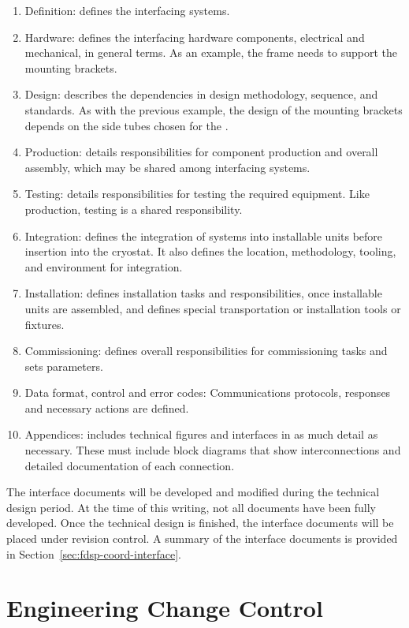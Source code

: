 \begin{enumerate}
 \item Definition: defines the interfacing systems.
 \item Hardware: defines the interfacing hardware components,
   electrical and mechanical, in general terms. As an
   example, the  frame needs to support the 
   mounting brackets.
 \item Design: describes the dependencies in design
   methodology, sequence, and standards. As with the
   previous example, the design of the  mounting
   brackets depends on the side tubes chosen for the .
 \item Production: details responsibilities for component production
   and overall assembly, which may be shared among interfacing
   systems.
 \item Testing: details responsibilities for testing the required
   equipment. Like production, testing is a shared responsibility.
 \item Integration: defines the integration of systems into installable units
   before insertion into the cryostat. 
   It also defines the location, methodology, tooling, and environment for integration.
 \item Installation: defines installation tasks and responsibilities, once
   installable units are assembled, and  defines  
   special transportation or installation tools or fixtures. 
 \item Commissioning: defines overall responsibilities for
   commissioning tasks  and sets parameters. 
 \item Data format, control and error codes: Communications protocols,
   responses and necessary actions are defined.
 \item Appendices: includes technical figures and interfaces 
   in as much detail as necessary. These must include block diagrams that
   show interconnections and detailed documentation of each connection.
\end{enumerate}


The interface documents will be developed and modified during the
technical design period. At the time of this writing, not all
documents have been fully developed. Once the technical design is
finished, the interface documents will be placed under revision
control. A summary of the interface documents is provided in
Section~\ref{sec:fdsp-coord-interface}.

\section{Engineering Change Control}
\label{sec:fdsp-change}

